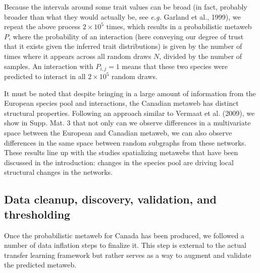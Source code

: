 \documentclass[10pt,oneside]{article}
\begin{document}
Because the intervals around some trait values can be broad (in fact,
probably broader than what they would actually be, see \emph{e.g.}
Garland et al., 1999), we repeat the above process \(2\times 10^5\)
times, which results in a probabilistic metaweb \(P\), where the
probability of an interaction (here conveying our degree of trust that
it exists given the inferred trait distributions) is given by the number
of times where it appears across all random draws \(N\), divided by the
number of samples. An interaction with \(P_{i,j} = 1\) means that these
two species were predicted to interact in all \(2\times 10^5\) random
draws.

It must be noted that despite bringing in a large amount of information
from the European species pool and interactions, the Canadian metaweb
has distinct structural properties. Following an approach similar to
Vermaat et al. (2009), we show in Supp. Mat. 3 that not only can we
observe differences in a multivariate space between the European and
Canadian metaweb, we can also observe differences in the same space
between random subgraphs from these networks. These results line up with
the studies spatializing metawebs that have been discussed in the
introduction: changes in the species pool are driving local structural
changes in the networks.

\hypertarget{data-cleanup-discovery-validation-and-thresholding}{%
\subsection{Data cleanup, discovery, validation, and
thresholding}\label{data-cleanup-discovery-validation-and-thresholding}}

Once the probabilistic metaweb for Canada has been produced, we followed
a number of data inflation steps to finalize it. This step is external
to the actual transfer learning framework but rather serves as a way to
augment and validate the predicted metaweb.
\end{document}
